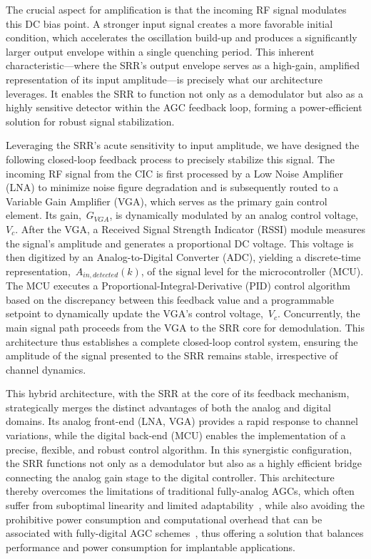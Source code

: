 \documentclass[journal]{IEEEtran}
\begin{document}
The crucial aspect for amplification is that the incoming RF signal modulates this DC bias point. A stronger input signal creates a more favorable initial condition, which accelerates the oscillation build-up and produces a significantly larger output envelope within a single quenching period. This inherent characteristic—where the SRR's output envelope serves as a high-gain, amplified representation of its input amplitude—is precisely what our architecture leverages. It enables the SRR to function not only as a demodulator but also as a highly sensitive detector within the AGC feedback loop, forming a power-efficient solution for robust signal stabilization.


Leveraging the SRR's acute sensitivity to input amplitude, we have designed the following closed-loop feedback process to precisely stabilize this signal. The incoming RF signal from the CIC is first processed by a Low Noise Amplifier (LNA) to minimize noise figure degradation and is subsequently routed to a Variable Gain Amplifier (VGA), which serves as the primary gain control element. Its gain,~$G_{VGA}$, is dynamically modulated by an analog control voltage,~$V_c$.
After the VGA, a Received Signal Strength Indicator (RSSI) module measures the signal's amplitude and generates a proportional DC voltage.
This voltage is then digitized by an Analog-to-Digital Converter (ADC), yielding a discrete-time representation,~$A_{in,detected}(k)$, of the signal level for the microcontroller (MCU). The MCU executes a Proportional-Integral-Derivative (PID) control algorithm based on the discrepancy between this feedback value and a programmable setpoint to dynamically update the VGA's control voltage,~$V_c$. Concurrently, the main signal path proceeds from the VGA to the SRR core for demodulation. This architecture thus establishes a complete closed-loop control system, ensuring the amplitude of the signal presented to the SRR remains stable, irrespective of channel dynamics.


This hybrid architecture, with the SRR at the core of its feedback mechanism, strategically merges the distinct advantages of both the analog and digital domains. Its analog front-end (LNA, VGA) provides a rapid response to channel variations, while the digital back-end (MCU) enables the implementation of a precise, flexible, and robust control algorithm. In this synergistic configuration, the SRR functions not only as a demodulator but also as a highly efficient bridge connecting the analog gain stage to the digital controller. This architecture thereby overcomes the limitations of traditional fully-analog AGCs, which often suffer from suboptimal linearity and limited adaptability~\cite{Zhao2023AnAF}, while also avoiding the prohibitive power consumption and computational overhead that can be associated with fully-digital AGC schemes~\cite{Li2020DigitalAC}, thus offering a solution that balances performance and power consumption for implantable applications.
\end{document}
